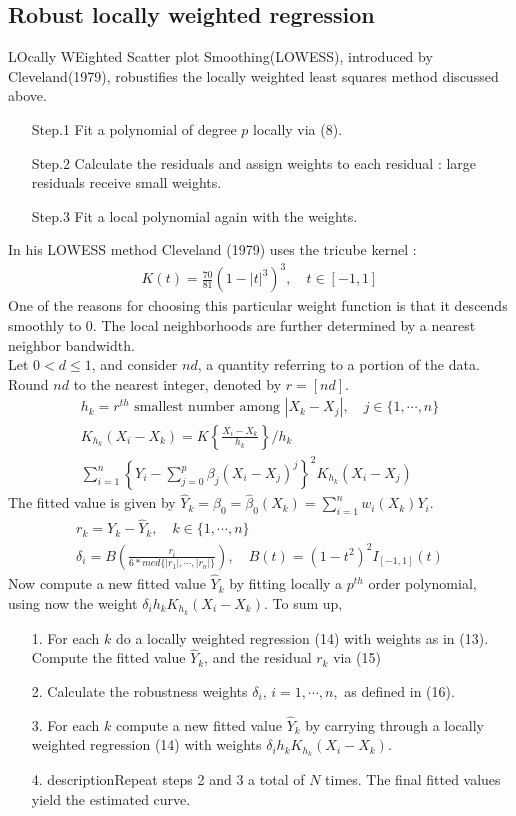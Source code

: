 \documentclass[12pt]{article}
\renewcommand{\=}[1]{\stackrel{#1}{=}} %
\theoremstyle{definition}
\begin{document}
\subsection{Robust locally weighted regression}
	LOcally WEighted Scatter plot Smoothing(LOWESS), introduced by Cleveland(1979), robustifies the locally weighted least squares method discussed above.
	\begin{itemize}
		\item[Step.1] Fit a polynomial of degree $p$ locally via (8).
		\item[Step.2] Calculate the residuals and assign weights to each residual : large residuals receive small weights.
		\item[Step.3] Fit a local polynomial again with the weights.
	\end{itemize}
	In his LOWESS method Cleveland (1979) uses the tricube kernel :
	\begin{align}
	K(t)=\frac{70}{81}(1-|t|^3)^3,\quad t\in[-1,1]
	\end{align}
	One of the reasons for choosing this particular weight function is that it descends smoothly to 0. The local neighborhoods are further determined by a nearest neighbor bandwidth. \\
	Let $0<d\leq1$, and consider $nd$, a quantity referring to a portion of the data. Round $nd$ to the nearest integer, denoted by $r=[nd]$.
	\begin{align}
	h_k=r^{th}\text{ smallest number among }|X_k-X_j|,\quad j\in\{1,\cdots,n\}\\
	K_{h_k}(X_i-X_k)=K\left\{\frac{X_i-X_k}{h_k}\right\}/h_k\\
	\sum_{i=1}^n\left\{Y_i-\sum_{j=0}^p\beta_j(X_i-X_j)^j
	\right\}^2K_{h_k}(X_i-X_j)
	\end{align}
	The fitted value is given by $\hat{Y}_k=\hat{\beta}_0=\hat{\beta}_0(X_k)=\sum_{i=1}^nw_i(X_k)Y_i$.
	\begin{align}
	r_k=Y_k-\hat{Y}_k,\quad k\in\{1,\cdots,n\}\\
	\delta_i=B\left(\frac{r_i}{6*med\{|r_1|,\cdots,|r_n|\}}\right),\quad B(t)=(1-t^2)^2I_{[-1,1]}(t)
	\end{align}
	Now compute a new fitted value $\hat{Y}_k$ by fitting locally a $p^{th}$ order polynomial, using now the weight $\delta_ih_kK_{h_k}(X_i-X_k)$. To sum up,
	\begin{itemize}
		\item[1.] For each $k$ do a locally weighted regression (14) with weights as in (13). Compute the fitted value $\hat{Y}_k$, and the residual $r_k$ via (15)
		\item[2.] Calculate the robustness weights $\delta_i,\,i=1,\cdots,n,$ as defined in (16).
		\item[3.] For each $k$ compute a new fitted value $\hat{Y}_k$ by carrying through a locally weighted regression (14) with weights $\delta_ih_kK_{h_k}(X_i-X_k)$.
		\item[4.] descriptionRepeat steps 2 and 3 a total of $N$ times. The final fitted values yield the estimated curve.
	\end{itemize}
\end{document}
